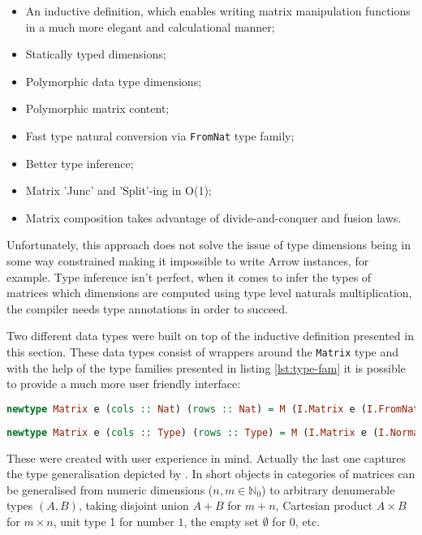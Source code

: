 \documentclass[
  oneside,
  11pt, a4paper,
  footinclude=true,
  headinclude=true,
  cleardoublepage=empty
]{scrbook}
\theoremstyle{definition}
\theoremstyle{definition}
\begin{document}
        \begin{itemize}
            \item An inductive definition, which enables writing matrix manipulation functions in a much more elegant and calculational manner;
            \item Statically typed dimensions;
            \item Polymorphic data type dimensions;
            \item Polymorphic matrix content;
            \item Fast type natural conversion via \texttt{FromNat} type family;
            \item Better type inference;
            \item Matrix 'Junc' and 'Split'-ing in O(1);
            \item Matrix composition takes advantage of divide-and-conquer and fusion laws.
        \end{itemize}{}
        
        Unfortunately, this approach does not solve the issue of type dimensions being in some way constrained making it impossible to write Arrow instances, for example. Type inference isn't perfect, when it comes to infer the types of matrices which dimensions are computed using type level naturals multiplication, the compiler needs type annotations in order to succeed.
        
        Two different data types were built on top of the inductive definition presented in this section. These data types consist of wrappers around the \texttt{Matrix} type and with the help of the type families presented in listing \ref{lst:type-fam} it is possible to provide a much more user friendly interface:
        
        \begin{lstlisting}[language=Haskell, caption={Dimensions are type level naturals},captionpos=b]
newtype Matrix e (cols :: Nat) (rows :: Nat) = M (I.Matrix e (I.FromNat cols) (I.FromNat rows))
        \end{lstlisting}
        
        \begin{lstlisting}[language=Haskell, caption={Dimensions are arbitrary data types},captionpos=b]
newtype Matrix e (cols :: Type) (rows :: Type) = M (I.Matrix e (I.Normalize cols) (I.Normalize rows))
        \end{lstlisting}
        
        These were created with user experience in mind. Actually the last one captures the type generalisation depicted by \cite{oliveira2012towards}. In short objects in categories of matrices can be generalised from numeric dimensions ($n, m \in \mathbb{N}_0$) to arbitrary denumerable types $(A,B)$, taking disjoint union $A + B$ for $m + n$, Cartesian product $A \times B$ for $m \times n$, unit type 1 for number $1$, the empty set $\emptyset$ for $0$, etc.
        
\end{document}
